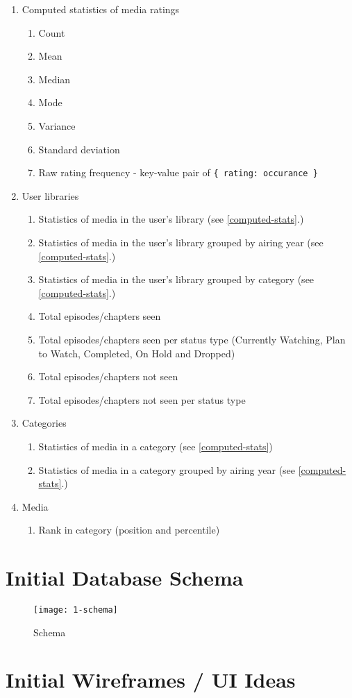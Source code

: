 \begin{enumerate}
  \item\label{computed-stats} Computed statistics of media ratings%
    \begin{enumerate}
      \item Count
      \item Mean
      \item Median
      \item Mode
      \item Variance
      \item Standard deviation
      \item Raw rating frequency - key-value pair of \texttt{\{ rating: occurance \}}
    \end{enumerate}
  \item User libraries
    \begin{enumerate}
      \item Statistics of media in the user's library (see \ref{computed-stats}.)
      \item Statistics of media in the user's library grouped by airing year (see \ref{computed-stats}.)
      \item Statistics of media in the user's library grouped by category (see \ref{computed-stats}.)
      \item Total episodes/chapters seen
      \item Total episodes/chapters seen per status type (Currently Watching, Plan to Watch, Completed, On Hold and Dropped)
      \item Total episodes/chapters not seen
      \item Total episodes/chapters not seen per status type
    \end{enumerate}
  \item Categories
    \begin{enumerate}
      \item Statistics of media in a category (see \ref{computed-stats})
      \item Statistics of media in a category grouped by airing year (see \ref{computed-stats}.)
    \end{enumerate}
  \item Media
    \begin{enumerate}
      \item Rank in category (position and percentile)
    \end{enumerate}
\end{enumerate}

\newpage
\section{Initial Database Schema}

\begin{figure}[H]
  \caption{Schema}
  \centering
  \texttt{[image: 1-schema]}
\end{figure}

\newpage
\section{Initial Wireframes / UI Ideas}
